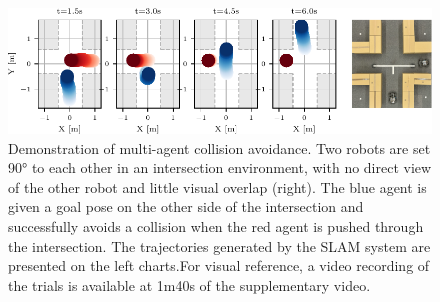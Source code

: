 \begin{figure}[h]
    \centering
    \captionsetup{format=plain, skip=0.5em}
    \includegraphics[width=0.9\linewidth]{figures/mar25_1_tracer_graph.pdf}

    \caption{Demonstration of multi-agent collision avoidance. Two robots are set 90° to each other in an intersection environment, with no direct view of the other robot and little visual overlap (right). The blue agent is given a goal pose on the other side of the intersection and successfully avoids a collision when the red agent is pushed through the intersection. The trajectories generated by the SLAM system are presented on the left charts.\captionbreak For visual reference, a video recording of the trials is available at 1m40s of the supplementary video\protect\footnotemark[1].}
    \label{fig:collision-avoidance}
\end{figure}

